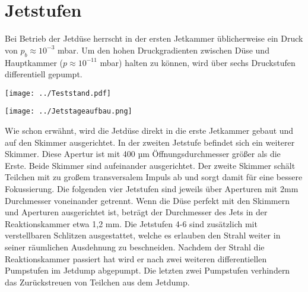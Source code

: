 
\section{Jetstufen} \label{sec:Jetstufen}

Bei Betrieb der Jetdüse herrscht in der ersten Jetkammer üblicherweise ein Druck von $p_b \approx 10^{-3}$ mbar. Um den hohen Druckgradienten zwischen Düse und Hauptkammer ($p \approx 10^{-11}$ mbar) halten zu können, wird über sechs Druckstufen differentiell gepumpt.

\begin{center}
\begin{minipage}{\linewidth}
\centering
\texttt{[image: ../Teststand.pdf]}%
 \label{fig:Teststand}
\end{minipage} 
\end{center} 

\begin{center}
\begin{minipage}{\linewidth}
\centering
\texttt{[image: ../Jetstageaufbau.png]}%
 \label{fig:Jetstageaufbau}
\end{minipage} 
\end{center} 


Wie schon erwähnt, wird die Jetdüse direkt in die erste Jetkammer gebaut und auf den Skimmer ausgerichtet. In der zweiten Jetstufe befindet sich ein weiterer Skimmer. Diese Apertur ist mit 400 µm Öffnungsdurchmesser größer als die Erste. Beide Skimmer sind aufeinander ausgerichtet. Der zweite Skimmer schält Teilchen mit zu großem transversalem Impuls ab und sorgt damit für eine bessere Fokussierung. Die folgenden vier Jetstufen sind jeweils über Aperturen mit 2mm Durchmesser voneinander getrennt. Wenn die Düse perfekt mit den Skimmern und Aperturen ausgerichtet ist, beträgt der Durchmesser des Jets in der Reaktionskammer etwa 1,2 mm. Die Jetstufen 4-6 sind zusätzlich mit verstellbaren Schlitzen ausgestattet, welche es erlauben den Strahl weiter in seiner räumlichen Ausdehnung zu beschneiden. Nachdem der Strahl die Reaktionskammer passiert hat wird er nach zwei weiteren differentiellen Pumpstufen im Jetdump abgepumpt. Die letzten zwei Pumpstufen verhindern das Zurückstreuen von Teilchen aus dem Jetdump.